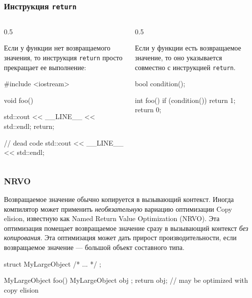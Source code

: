 \documentclass[compress, 8pt, aspectratio=169]{beamer}
\begin{document}
\begin{frame}[fragile]

    \frametitle{Инструкция \texttt{return}}

    \begin{columns}[T]

        \begin{column}{0.5\textwidth}

            Если у функции нет возвращаемого значения, то инструкция \verb|return|
            просто прекращает ее выполнение:

            \begin{myinplacelisting}[minted language=cpp]
#include <iostream>

void foo() {
    std::cout << __LINE__
        << std::endl;
    return;

    // dead code
    std::cout << __LINE__
        << std::endl;
}
            \end{myinplacelisting}

        \end{column}

        \begin{column}{0.5\textwidth}

            Если у функции есть возвращаемое значение, то оно указывается
            совместно с инструкцией \verb|return|.

            \begin{myinplacelisting}[minted language=cpp]
bool condition();

int foo() {
    if (condition()) {
        return 1;
    }
    return 0;
}
            \end{myinplacelisting}

        \end{column}

    \end{columns}

\end{frame}

\begin{frame}[fragile]

    \frametitle{NRVO}

    Возвращаемое значение обычно копируется в вызывающий контекст.
    Иногда компилятор может применить \textit{необязательную} вариацию оптимизации
    Copy elision, известную как Named Return Value Optimization (NRVO).
    Эта оптимизация помещает возвращаемое значение сразу в вызывающий контекст
    \textit{без копирования}.
    Эта оптимизация может дать прирост производительности, если возвращаемое значение
    --- большой объект составного типа.

    \begin{myinplacelisting}[minted language=cpp]
struct MyLargeObject { /* ... */ };

MyLargeObject foo() {
    MyLargeObject obj {};
    return obj; // may be optimized with copy elision
}
    \end{myinplacelisting}

\end{frame}
\end{document}

